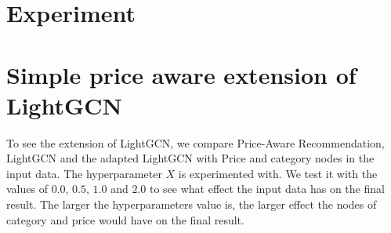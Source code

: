 \section{Experiment}

\section{Simple price aware extension of LightGCN}
To see the extension of LightGCN, we compare Price-Aware Recommendation, LightGCN and the adapted LightGCN with Price and category nodes in the input data. 
The hyperparameter $X$ is experimented with.  
We test it with the values of $0.0$, $0.5$, $1.0$ and $2.0$ to see what effect the input data has on the final result.
The larger the hyperparameters value is, the larger effect the nodes of category and price would have on the final result.
